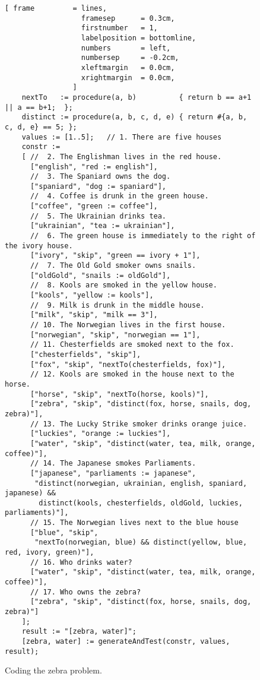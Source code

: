 \begin{figure}[!ht]
\centering
\begin{Verbatim}[ frame         = lines, 
                  framesep      = 0.3cm, 
                  firstnumber   = 1,
                  labelposition = bottomline,
                  numbers       = left,
                  numbersep     = -0.2cm,
                  xleftmargin   = 0.0cm,
                  xrightmargin  = 0.0cm,
                ]
    nextTo   := procedure(a, b)          { return b == a+1 || a == b+1;  };
    distinct := procedure(a, b, c, d, e) { return #{a, b, c, d, e} == 5; };
    values := [1..5];   // 1. There are five houses
    constr := 
    [ //  2. The Englishman lives in the red house.
      ["english", "red := english"],
      //  3. The Spaniard owns the dog.
      ["spaniard", "dog := spaniard"],
      //  4. Coffee is drunk in the green house.
      ["coffee", "green := coffee"],
      //  5. The Ukrainian drinks tea.
      ["ukrainian", "tea := ukrainian"],
      //  6. The green house is immediately to the right of the ivory house.
      ["ivory", "skip", "green == ivory + 1"],
      //  7. The Old Gold smoker owns snails.
      ["oldGold", "snails := oldGold"],
      //  8. Kools are smoked in the yellow house.
      ["kools", "yellow := kools"],
      //  9. Milk is drunk in the middle house.
      ["milk", "skip", "milk == 3"],
      // 10. The Norwegian lives in the first house.
      ["norwegian", "skip", "norwegian == 1"],
      // 11. Chesterfields are smoked next to the fox.
      ["chesterfields", "skip"],
      ["fox", "skip", "nextTo(chesterfields, fox)"],
      // 12. Kools are smoked in the house next to the horse.
      ["horse", "skip", "nextTo(horse, kools)"],
      ["zebra", "skip", "distinct(fox, horse, snails, dog, zebra)"],
      // 13. The Lucky Strike smoker drinks orange juice.
      ["luckies", "orange := luckies"],
      ["water", "skip", "distinct(water, tea, milk, orange, coffee)"],
      // 14. The Japanese smokes Parliaments.
      ["japanese", "parliaments := japanese",
       "distinct(norwegian, ukrainian, english, spaniard, japanese) && 
        distinct(kools, chesterfields, oldGold, luckies, parliaments)"],
      // 15. The Norwegian lives next to the blue house
      ["blue", "skip",
       "nextTo(norwegian, blue) && distinct(yellow, blue, red, ivory, green)"],
      // 16. Who drinks water?
      ["water", "skip", "distinct(water, tea, milk, orange, coffee)"],
      // 17. Who owns the zebra?
      ["zebra", "skip", "distinct(fox, horse, snails, dog, zebra)"]
    ];
    result := "[zebra, water]";
    [zebra, water] := generateAndTest(constr, values, result);
\end{Verbatim}
\vspace*{-0.3cm}
\caption{Coding the zebra problem.}
\label{fig:zebra.stlx}
\end{figure}

